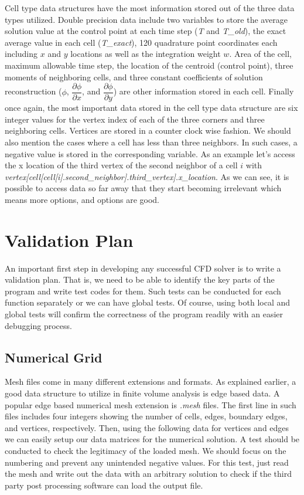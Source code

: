 \documentclass{article}
\begin{document}
Cell type data structures have the most information stored out of the three data types utilized. Double precision data include two variables to store the average solution value at the control point at each time step (\textit{T} and \textit{T\_old}), the exact average value in each cell (\textit{T\_exact}), 120 quadrature point coordinates each including $x$ and $y$ locations as well as the integration weight $w$. Area of the cell, maximum allowable time step, the location of the centroid (control point), three moments of neighboring cells, and three constant coefficients of solution reconstruction ($\phi$, $\dfrac{\partial \phi}{\partial x}$, and $\dfrac{\partial \phi}{\partial y}$) are other information stored in each cell. Finally once again, the most important data stored in the cell type data structure are six integer values for the vertex index of each of the three corners and three neighboring cells. Vertices are stored in a counter clock wise fashion. We should also mention the cases where a cell has less than three neighbors. In such cases, a negative value is stored in the corresponding variable. As an example let's access the x location of the third vertex of the second neighbor of a cell $i$ with \textit{vertex[cell[cell[i].second\_neighbor].third\_vertex].x\_location}. As we can see, it is possible to access data so far away that they start becoming irrelevant which means more options, and options are good.




\section{Validation Plan}
An important first step in developing any successful CFD solver is to write a validation plan. That is, we need to be able to identify the key parts of the program and write test codes for them. Such tests can be conducted for each function separately or we can have global tests. Of course, using both local and global tests will confirm the correctness of the program readily with an easier debugging process.

\subsection{Numerical Grid}
Mesh files come in many different extensions and formats. As explained earlier, a good data structure to utilize in finite volume analysis is edge based data. A popular edge based numerical mesh extension is \textit{.mesh} files. The first line in such files includes four integers showing the number of cells, edges, boundary edges, and vertices, respectively. Then, using the following data for vertices and edges we can easily setup our data matrices for the numerical solution. A test should be conducted to check the legitimacy of the loaded mesh. We should focus on the numbering and prevent any unintended negative values. For this test, just read the mesh and write out the data with an arbitrary solution to check if the third party post processing software can load the output file.
\end{document}
